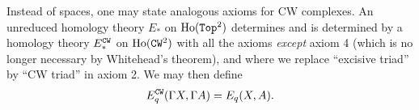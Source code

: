 \documentclass{article}[11pt]
\begin{document}
\begin{remark} Instead of spaces, one may state analogous axioms for CW complexes. An unreduced homology theory $E_\ast$ on $\text{Ho}(\texttt{Top}^2)$ determines and is determined by a homology theory $E^{\texttt{CW}}_\ast$ on $\text{Ho}(\texttt{CW}^2)$ with all the axioms \textit{except} axiom 4 (which is no longer necessary by Whitehead's theorem), and where we replace ``excisive triad'' by ``CW triad'' in axiom 2. We may then define
\begin{align*}
	E_q^{\texttt{CW}} (\Gamma X, \Gamma A)= E_q (X,A).
\end{align*}
\end{remark}


\end{document}
